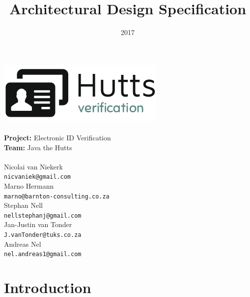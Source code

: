 \documentclass{article}
\title{Architectural Design Specification}
\date{2017}
\begin{document}
\makeatletter
    \begin{titlepage}
        \begin{center}
            {\includegraphics[width=0.7\linewidth]{img/hutts-verification.png}}\\[2ex]
            \vspace{3cm}
            {\huge \bfseries \@title }\\[2ex]
            {\LARGE \textbf{Project:} Electronic ID Verification}\\[2ex]
            {\LARGE \textbf{Team:} Java the Hutts}\\[2ex]
            {\LARGE \@date}\\[2ex]
            \vspace{3cm}
            {\large  Nicolai van Niekerk\\ \texttt{nicvaniek@gmail.com}}\\[2ex]
            {\large  Marno Hermann\\ \texttt{marno@barnton-consulting.co.za}}\\[2ex]
            {\large  Stephan Nell\\ \texttt{nellstephanj@gmail.com}}\\[2ex]
            {\large  Jan-Justin van Tonder\\ \texttt{J.vanTonder@tuks.co.za}}\\[2ex]
            {\large  Andreas Nel\\ \texttt{nel.andreas1@gmail.com}}\\[2ex]
        \end{center}
        
    \end{titlepage}
\makeatother

\cleardoublepage
\thispagestyle{empty}
\tableofcontents
\newpage

\setcounter{page}{1}
	\section{Introduction}
\end{document}
